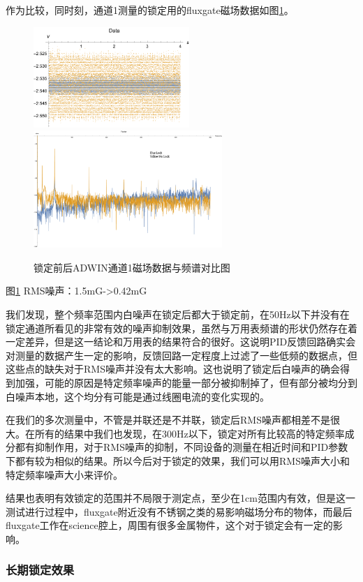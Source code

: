 \documentclass[onecolumn,a4paper,10pt]{article}
\begin{document}
作为比较，同时刻，通道1测量的锁定用的fluxgate磁场数据如图\ref{fig:1204}。

\begin{figure}[htbp]
\centering
\includegraphics[height=1.5in]{Data-Sensor1-Adwin}%
\hspace{0.4in}%
\includegraphics[height=1.75in]{Fourier-Sensor1-Adwin.pdf}
\caption{锁定前后ADWIN通道1磁场数据与频谱对比图}
\label{fig:1204}
\end{figure}
图\ref{fig:1204} RMS噪声：1.5mG->0.42mG


我们发现，整个频率范围内白噪声在锁定后都大于锁定前，在50Hz以下并没有在锁定通道所看见的非常有效的噪声抑制效果，虽然与万用表频谱的形状仍然存在着一定差异，但是这一结论和万用表的结果符合的很好。这说明PID反馈回路确实会对测量的数据产生一定的影响，反馈回路一定程度上过滤了一些低频的数据点，但这些点的缺失对于RMS噪声并没有太大影响。这也说明了锁定后白噪声的确会得到加强，可能的原因是特定频率噪声的能量一部分被抑制掉了，但有部分被均分到白噪声本地，这个均分有可能是通过线圈电流的变化实现的。

在我们的多次测量中，不管是并联还是不并联，锁定后RMS噪声都相差不是很大。在所有的结果中我们也发现，在300Hz以下，锁定对所有比较高的特定频率成分都有抑制作用，对于RMS噪声的抑制，不同设备的测量在相近时间和PID参数下都有较为相似的结果。所以今后对于锁定的效果，我们可以用RMS噪声大小和特定频率噪声大小来评价。

结果也表明有效锁定的范围并不局限于测定点，至少在1cm范围内有效，但是这一测试进行过程中，fluxgate附近没有不锈钢之类的易影响磁场分布的物体，而最后fluxgate工作在science腔上，周围有很多金属物件，这个对于锁定会有一定的影响。

\subsubsection{长期锁定效果}
\end{document}
